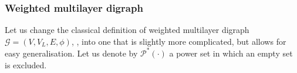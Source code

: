 \documentclass[a4paper,12pt]{article}
\theoremstyle{definition}
\newtheorem{definition}{Definition}%
\theoremstyle{remark}
\newcommand{\mat}[1]{\todo[inline,color=cMat]{\color{black}#1}}
\newcommand{\aadd}[2][]{\added[id=Alex,comment=#1]{#2}}
\newcommand{\mG}{\mathcal{G}}
\newcommand{\EG}{E_{\mathcal{G}}}
\begin{document}
\subsubsection{Weighted multilayer digraph}
Let us change the classical definition of weighted multilayer  digraph $\mG = (V,V_L,E,\phi)$, \cite[Sec.~2.1]{KivArena2014}, into one that is slightly more complicated, but allows for easy generalisation. Let us denote by $\mathcal{P}^*(\cdot)$ a power set in which an empty set is excluded.
\end{document}
